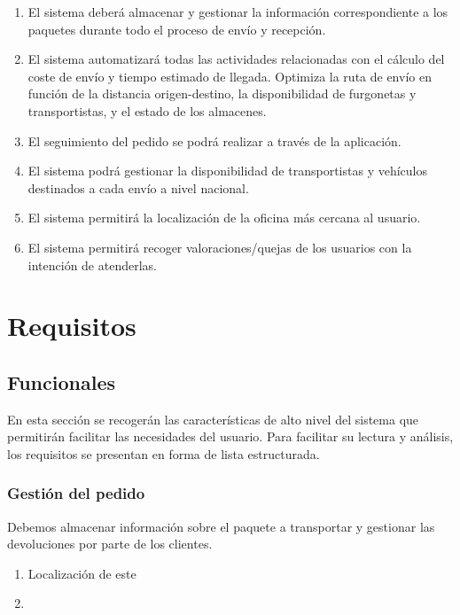 \begin{enumerate}
	\item El sistema deberá almacenar y gestionar la información correspondiente a los paquetes durante todo el proceso de envío y recepción.
	\item El sistema automatizará todas las actividades relacionadas con el cálculo del coste de envío y tiempo estimado de llegada. Optimiza la ruta de envío en función de la distancia origen-destino, la disponibilidad de furgonetas y transportistas, y el estado de los almacenes.
	\item El seguimiento del pedido se podrá realizar a través de la aplicación.
	\item El sistema podrá gestionar la disponibilidad de transportistas y vehículos destinados a cada envío a nivel nacional.
	\item El sistema permitirá la localización de la oficina más cercana al usuario.
	\item El sistema permitirá recoger valoraciones/quejas de los usuarios con la intención de atenderlas.
	 
\end{enumerate}
\newpage

\section{Requisitos}
\subsection{Funcionales}
En esta sección se recogerán las características de alto nivel del sistema que permitirán facilitar las necesidades del usuario. Para facilitar su lectura y análisis, los requisitos se presentan en forma de lista estructurada. 
\subsubsection{Gestión del pedido}
Debemos almacenar información sobre el paquete a transportar y gestionar las devoluciones por parte de los clientes.  
\begin{enumerate}
	\item Localización de este
	\item 
\end{enumerate}

